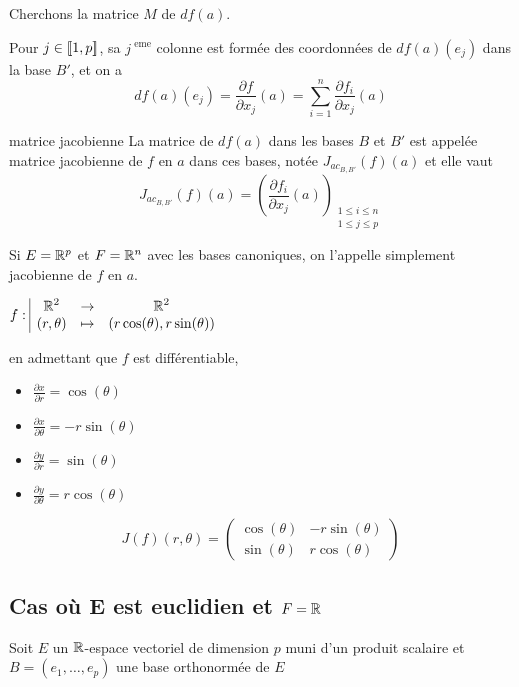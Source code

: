 Cherchons la matrice $M$ de $df(a)$. 

Pour $j \in [\![1, p]\!]$, sa $j^{\text{ eme}}$ colonne est formée des coordonnées 
de $df(a)(e_j)$ dans la base $B'$, et on a 
$$df(a)(e_j) = \frac{\partial f}{\partial x_j} (a) = \sum_{i = 1 }^{n } \frac{\partial f_i}{\partial x_j} (a)$$

\begin{definition}{matrice jacobienne}{}
    La matrice de $df(a)$ dans les bases $B$ et $B'$ est appelée matrice jacobienne de
    $f$ en $a$ dans ces bases, notée $J_{ac_{B, B'}}(f)(a)$ et elle vaut 
    $$J_{ac_{B, B'}}(f)(a) = \left( \frac{\partial f_i}{\partial x_j} (a) \right)_{\substack{1 \leqslant i \leqslant n \\ 1 \leqslant j \leqslant p}}$$

    Si $E = \mathbb{R}^p$ et $F = \mathbb{R}^n$ avec les bases canoniques, on l'appelle simplement 
    jacobienne de $f$ en $a$. 
\end{definition}

\begin{exemple}
    $f: \space \begin{array}{|ccc} \displaystyle \mathbb{R}^2 & \to & \displaystyle \mathbb{R}^2 \\ \displaystyle (r, \theta) & \mapsto & \displaystyle (r \cos(\theta), r \sin (\theta)) \end{array}$

    en admettant que $f$ est différentiable,
    \begin{itemize}
        \item $\frac{\partial x }{\partial r } = \cos(\theta)$
        \item $\frac{\partial x }{\partial \theta } = -r \sin(\theta)$
        \item $\frac{\partial y }{\partial r } = \sin(\theta)$
        \item $\frac{\partial y }{\partial \theta } = r \cos(\theta)$
    \end{itemize}

    $$ J(f)(r, \theta) = \begin{pmatrix}
        \cos(\theta) & -r \sin(\theta) \\
        \sin(\theta) & r \cos(\theta)
    \end{pmatrix}$$
\end{exemple}

\subsection{Cas où E est euclidien et \texorpdfstring{$F = \mathbb{R}$}{F = R}}

Soit $E$ un $\mathbb{R}$-espace vectoriel de dimension $p$ muni d'un produit scalaire et 
$B = (e_1, \ldots, e_p)$ une base orthonormée de $E$


